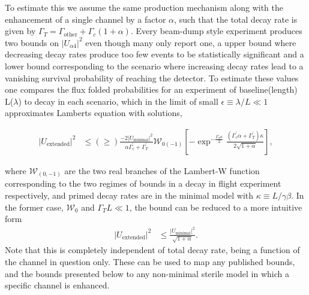 \documentclass[11pt, a4paper]{article}
\begin{document}
To estimate this we assume the same production mechanism along with the
enhancement of a single channel by a factor $\alpha$, such that the total decay
rate is given by $\Gamma_T = \Gamma_\text{other}+\Gamma_c (1+\alpha)$. Every
beam-dump style experiment produces two bounds on $|U_{\alpha 4}|^2$ even
though many only report one, a upper bound where decreasing decay rates produce
too few events to be statistically significant and a lower bound corresponding
to the scenario where increasing decay rates lead to a vanishing survival
probability of reaching the detector. To estimate these values one compares the
flux folded probabilities for an experiment of baseline(length) L($\lambda$) to
decay in each scenario, which in the limit of small $\epsilon \equiv \lambda/L
\ll 1$ approximates Lamberts equation with solutions, 

\begin{align*}
|U_\text{extended}|^2 &\leq (\geq) \frac{-2 |U_\text{minimal}|^2}{\alpha
\Gamma^\prime_c +\Gamma^\prime_T}
\mathcal{W}_{0(-1)}\left[-\exp^{-\frac{\Gamma^\prime_T \kappa}{2}}
\frac{(\Gamma^\prime_c \alpha + \Gamma^\prime_T)\kappa}{2\sqrt{1+\alpha}}
\right],
\end{align*} 

where $\mathcal{W}_{(0,-1)}$ are the two real branches of
the Lambert-W function corresponding to the two regimes of bounds in a decay in
flight experiment respectively, and primed decay rates are in the minimal model
with $\kappa \equiv L/\gamma \beta$. In the former case, $\mathcal{W}_0$ and
$\Gamma_T L \ll 1$, the bound can be reduced to a more intuitive form
\begin{align*} |U_\text{extended}|^2 &\leq
\frac{|U_{\text{minimal}}|^2}{\sqrt{1+\alpha}}.  \end{align*} Note that this is
completely independent of total decay rate, being a function of the channel in
question only.  These can be used to map any published bounds, and the bounds
presented below to any non-minimal sterile model in which a specific channel is
enhanced.\\
\end{document}
